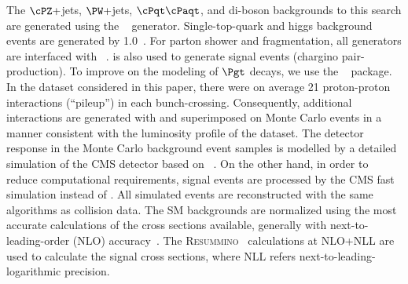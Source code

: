 The $\cPZ +$jets, $\PW +$jets, $\cPqt\cPaqt$, and di-boson backgrounds to this search  are generated using the ~\cite{Alwall:2011uj} generator.
Single-top-quark and higgs background events are generated by {\POWHEG} 1.0~\cite{Nason:2004rx,Frixione:2007vw,Alioli:2009je,Alioli:2010xd}.
For parton shower and fragmentation, all generators are interfaced with ~\cite{Sjostrand:2006za}.
\PYTHIA is also used to generate signal events (chargino pair-production). To improve on the modeling of $\Pgt$ decays, we use the  \TAUOLA~\cite{Davidson:2010rw} package.
In the dataset considered in this paper,
there were on average 21 proton-proton interactions (``pileup'') in each bunch-crossing.
Consequently, additional interactions are generated with \PYTHIA and superimposed on Monte Carlo events in a manner consistent with the
luminosity profile of the dataset.
The detector response in the Monte Carlo background event samples is modelled by a
detailed simulation
of the CMS detector based on {\GEANTfour}~\cite{Agostinelli:2002hh}.  On the other hand, in order to reduce  computational requirements, signal events 
are processed by the CMS fast simulation \cite{Abdullin:2011zz} instead of {\GEANTfour}. 
All simulated events are reconstructed with the same algorithms as collision data.
The SM backgrounds are normalized using the most accurate calculations of the cross sections available,
generally with next-to-leading-order (NLO)
accuracy~\cite{Campbell:2012uf,Campbell:2011bn,xsec_WZ}.
The \textsc{Resummino}~\cite{Fuks:2012qx,Fuks:2013vua,Fuks:2013lya} calculations at NLO+NLL are used to calculate the signal cross sections, where 
NLL refers next-to-leading-logarithmic precision.






